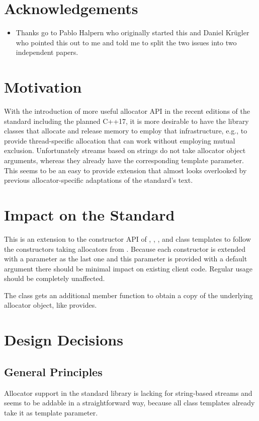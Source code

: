 \documentclass[ebook,11pt,article]{memoir}
\begin{document}
\chapter{Acknowledgements}
\begin{itemize}
\item Thanks go to Pablo Halpern who originally started this and Daniel Kr\"ugler who pointed this out to me and told me to split the two issues into two independent papers.
\end{itemize}

\chapter{Motivation}
With the introduction of more useful allocator API in the recent editions of the standard including the planned C++17, it is more desirable to have the library classes that allocate and release memory to employ that infrastructure, e.g., to provide thread-specific allocation that can work without employing mutual exclusion. Unfortunately streams based on strings do not take allocator object arguments, whereas they already have the corresponding template parameter. This seems to be an easy to provide extension that almost looks overlooked by previous allocator-specific adaptations of the standard's text.
\begin{codeblock}
\end{codeblock}

\chapter{Impact on the Standard}
This is an extension to the constructor API of , , , and  class templates to follow the constructors taking allocators from . Because each constructor is extended with a parameter as the last one and this parameter is provided with a default argument there should be minimal impact on existing client code. Regular usage should be completely unaffected. 

The class  gets an additional member function to obtain a copy of the underlying allocator object, like  provides.

\chapter{Design Decisions}
\section{General Principles}
Allocator support in the standard library is lacking for string-based streams and seems to be addable in a straightforward way, because all class templates already take it as template parameter.
\end{document}
